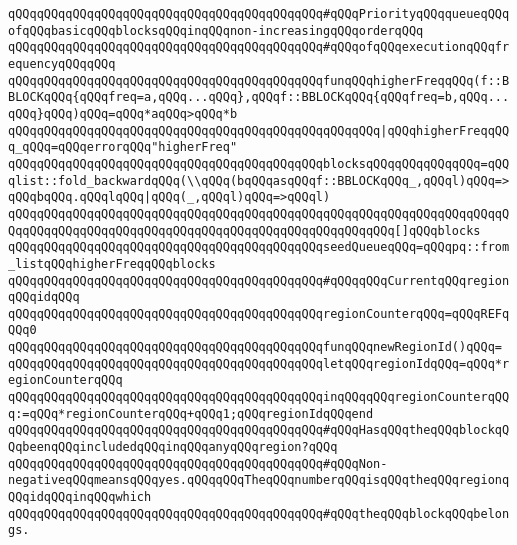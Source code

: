 \verb|qQQqqQQqqQQqqQQqqQQqqQQqqQQqqQQqqQQqqQQqqQQq#qQQqPriorityqQQqqueueqQQqofqQQqbasicqQQqblocksqQQqinqQQqnon-increasingqQQqorderqQQq|\newline
\verb|qQQqqQQqqQQqqQQqqQQqqQQqqQQqqQQqqQQqqQQqqQQq#qQQqofqQQqexecutionqQQqfrequencyqQQqqQQq|\newline
\newline
\verb|qQQqqQQqqQQqqQQqqQQqqQQqqQQqqQQqqQQqqQQqqQQqfunqQQqhigherFreqqQQq(f::BBLOCKqQQq{qQQqfreq=a,qQQq...qQQq},qQQqf::BBLOCKqQQq{qQQqfreq=b,qQQq...qQQq}qQQq)qQQq=qQQq*aqQQq>qQQq*b|\newline
\verb|qQQqqQQqqQQqqQQqqQQqqQQqqQQqqQQqqQQqqQQqqQQqqQQqqQQq|\verb#|qQQqhigherFreqqQQq_qQQq=qQQqerrorqQQq"higherFreq"#\newline
\verb|qQQqqQQqqQQqqQQqqQQqqQQqqQQqqQQqqQQqqQQqqQQqblocksqQQqqQQqqQQqqQQq=qQQqlist::fold_backwardqQQq(\\qQQq(bqQQqasqQQqf::BBLOCKqQQq_,qQQql)qQQq=>qQQqbqQQq.qQQqlqQQq|\verb#|qQQq(_,qQQql)qQQq=>qQQql)#\newline
\verb|qQQqqQQqqQQqqQQqqQQqqQQqqQQqqQQqqQQqqQQqqQQqqQQqqQQqqQQqqQQqqQQqqQQqqQQqqQQqqQQqqQQqqQQqqQQqqQQqqQQqqQQqqQQqqQQqqQQqqQQqqQQq[]qQQqblocks|\newline
\verb|qQQqqQQqqQQqqQQqqQQqqQQqqQQqqQQqqQQqqQQqqQQqseedQueueqQQq=qQQqpq::from_listqQQqhigherFreqqQQqblocks|\newline
\newline
\verb|qQQqqQQqqQQqqQQqqQQqqQQqqQQqqQQqqQQqqQQqqQQq#qQQqqQQqCurrentqQQqregionqQQqidqQQq|\newline
\verb|qQQqqQQqqQQqqQQqqQQqqQQqqQQqqQQqqQQqqQQqqQQqregionCounterqQQq=qQQqREFqQQq0|\newline
\verb|qQQqqQQqqQQqqQQqqQQqqQQqqQQqqQQqqQQqqQQqqQQqfunqQQqnewRegionId()qQQq=|\newline
\verb|qQQqqQQqqQQqqQQqqQQqqQQqqQQqqQQqqQQqqQQqqQQqletqQQqregionIdqQQq=qQQq*regionCounterqQQq|\newline
\verb|qQQqqQQqqQQqqQQqqQQqqQQqqQQqqQQqqQQqqQQqqQQqinqQQqqQQqregionCounterqQQq:=qQQq*regionCounterqQQq+qQQq1;qQQqregionIdqQQqend|\newline
\newline
\verb|qQQqqQQqqQQqqQQqqQQqqQQqqQQqqQQqqQQqqQQqqQQq#qQQqHasqQQqtheqQQqblockqQQqbeenqQQqincludedqQQqinqQQqanyqQQqregion?qQQq|\newline
\verb|qQQqqQQqqQQqqQQqqQQqqQQqqQQqqQQqqQQqqQQqqQQq#qQQqNon-negativeqQQqmeansqQQqyes.qQQqqQQqTheqQQqnumberqQQqisqQQqtheqQQqregionqQQqidqQQqinqQQqwhich|\newline
\verb|qQQqqQQqqQQqqQQqqQQqqQQqqQQqqQQqqQQqqQQqqQQq#qQQqtheqQQqblockqQQqbelongs.|\newline
